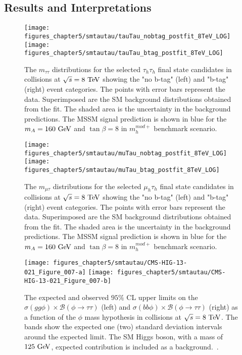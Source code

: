 \subsection{Results and Interpretations}

\begin{figure}[htbp]
\centering
\texttt{[image: figures\_chapter5/smtautau/tauTau\_nobtag\_postfit\_8TeV\_LOG]}
\texttt{[image: figures\_chapter5/smtautau/tauTau\_btag\_postfit\_8TeV\_LOG]}
\caption{The $m_{\tau\tau}$ distributions for the selected $\tau_{h}\tau_{h}$ final state candidates in collisions at $\sqrt{s}=8~\mathrm{Te\kern -0.1em V}$ showing the "no b-tag" (left) and "b-tag" (right) event categories. The points with error bars represent the data. Superimposed are the SM background distributions obtained from the fit. The shaded area is the uncertainty in the background predictions. The MSSM signal prediction is shown in blue for the $m_{A}=160~\mathrm{Ge\kern -0.1em V}$ and $\tan \beta=8$ in $m_{h}^{mod+}$ benchmark scenario.}
\label{fig:mssmtauhtauh}
\end{figure}

\begin{figure}[htbp]
\centering
\texttt{[image: figures\_chapter5/smtautau/muTau\_nobtag\_postfit\_8TeV\_LOG]}
\texttt{[image: figures\_chapter5/smtautau/muTau\_btag\_postfit\_8TeV\_LOG]}
\caption{The $m_{\mu\tau}$ distributions for the selected $\mu_{h}\tau_{h}$ final state candidates in collisions at $\sqrt{s}=8~\mathrm{Te\kern -0.1em V}$ showing the "no b-tag" (left) and "b-tag" (right) event categories. The points with error bars represent the data. Superimposed are the SM background distributions obtained from the fit. The shaded area is the uncertainty in the background predictions. The MSSM signal prediction is shown in blue for the $m_{A}=160~\mathrm{Ge\kern -0.1em V}$ and $\tan \beta=8$ in $m_{h}^{mod+}$ benchmark scenario.}
\label{fig:mssmmutauh}
\end{figure}

\begin{figure}[htbp]
\centering
\texttt{[image: figures\_chapter5/smtautau/CMS-HIG-13-021\_Figure\_007-a]}
\texttt{[image: figures\_chapter5/smtautau/CMS-HIG-13-021\_Figure\_007-b]}
\caption{The expected and observed $95\%$ CL upper limits on the $\sigma(gg\phi) \times \mathcal{B}(\phi \rightarrow\tau\tau)$ (left) and $\sigma(bb\phi) \times \mathcal{B}(\phi \rightarrow \tau\tau)$ (right) as a function of the $\phi$ mass hypothesis in collisions at $\sqrt{s}=8~\mathrm{Te\kern -0.1em V}$. The bands show the expected one (two) standard deviation intervals around the expected limit. The SM Higgs boson, with a mass of $125~\mathrm{Ge\kern -0.1em V}$, expected contribution is included as a background.~\cite{Khachatryan:2014wca}.}
\label{fig:mssmtautau}
\end{figure}


